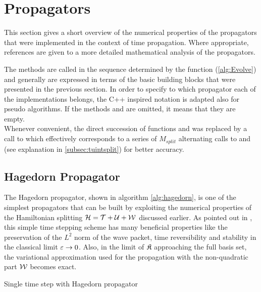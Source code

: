 \section{Propagators}
\label{sec:propagators}

This section gives a short overview of the numerical properties of the propagators that were implemented in the context of time propagation.
Where appropriate, references are given to a more detailed mathematical analysis of the propagators.
\par\medskip
The methods are called in the sequence determined by the  function (\ref{alg:Evolve}) and generally are expressed in terms of the basic building blocks that were presented in the previous section.
In order to specify to which propagator each of the implementations belongs, the C++ inspired notation  is adapted also for pseudo algorithms.
If the methods  and  are omitted, it means that they are empty. \\
Whenever convenient, the direct succession of functions  and  was replaced by a call to  which effectively corresponds to a series of $M_{split}$ alternating calls to  and  (see explanation in \ref{subsec:tuintsplit}) for better accuracy.

\subsection{Hagedorn Propagator}
\label{sub:hagedorn_propagator}
%
The Hagedorn propagator, shown in algorithm \ref{alg:hagedorn}, is one of the simplest propagators that can be built by exploiting the numerical properties of the Hamiltonian splitting $\mathcal{H} = \mathcal{T} + \mathcal{U} + \mathcal{W}$ discussed earlier.
As pointed out in \cite{FGL_semiclassical_dynamics}, this simple time stepping scheme has many beneficial properties like the preservation of the $L^2$ norm of the wave packet, time reversibility and stability in the classical limit $\varepsilon \rightarrow 0$.
Also, in the limit of $\mathfrak{K}$ approaching the full basis set, the variational approximation used for the propagation with the non-quadratic part $\mathcal{W}$ becomes exact.
\begin{algorithm}[ht]
	\caption{Single time step with Hagedorn propagator}
	\label{alg:hagedorn}
	\begin{algorithmic}
	\State
		\State
			\State {}
			\State {}
			\State {}
			\State {}
		\State
		\EndProcedure
	\end{algorithmic}
\end{algorithm}


